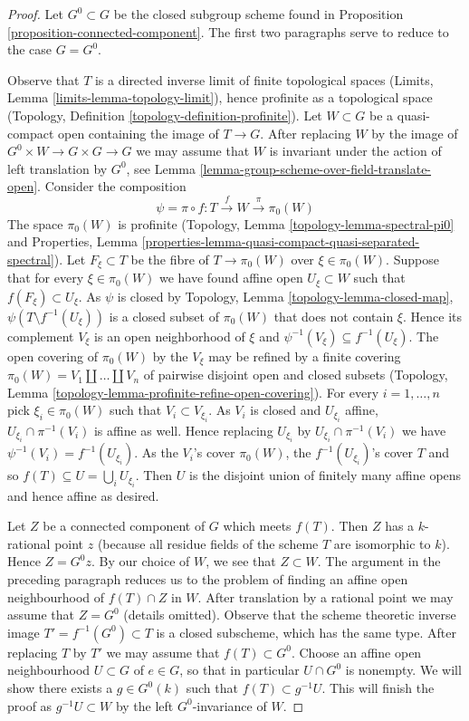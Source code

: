 \begin{proof}
Let $G^0 \subset G$ be the closed subgroup scheme found in
Proposition \ref{proposition-connected-component}. The first two paragraphs
serve to reduce to the case $G = G^0$.

\medskip\noindent
Observe that $T$ is a directed inverse limit of finite topological spaces
(Limits, Lemma \ref{limits-lemma-topology-limit}), hence profinite as a
topological space (Topology, Definition \ref{topology-definition-profinite}).
Let $W \subset G$ be a quasi-compact open containing the image of $T \to G$.
After replacing $W$ by the image of $G^0 \times W \to G \times G \to G$ we may
assume that $W$ is invariant under the action of left translation by $G^0$, see
Lemma \ref{lemma-group-scheme-over-field-translate-open}.
Consider the composition
$$
\psi = \pi \circ f : T \xrightarrow{f} W \xrightarrow{\pi} \pi_0(W)
$$
The space $\pi_0(W)$ is profinite
(Topology, Lemma \ref{topology-lemma-spectral-pi0} and
Properties, Lemma
\ref{properties-lemma-quasi-compact-quasi-separated-spectral}).
Let $F_\xi \subset T$ be the fibre of $T \to \pi_0(W)$ over $\xi \in \pi_0(W)$.
Suppose that for every $\xi \in \pi_0(W)$ we have found affine open
$U_\xi \subset W$ such that $f(F_\xi) \subset U_\xi$. As $\psi$ is closed by
Topology, Lemma \ref{topology-lemma-closed-map},
$\psi(T \setminus f^{-1}(U_\xi))$ is a closed subset of $\pi_0(W)$
that does not contain $\xi$. Hence its complement $V_\xi$ is an
open neighborhood of $\xi$ and $\psi^{-1}(V_\xi) \subseteq f^{-1}(U_\xi)$.
The open covering of $\pi_0(W)$ by the $V_\xi$ may be refined by
a finite covering $\pi_0(W) = V_1 \amalg \ldots \amalg V_n$
of pairwise disjoint open and closed subsets (Topology,
Lemma \ref{topology-lemma-profinite-refine-open-covering}).
For every $i = 1, \ldots, n$ pick $\xi_i \in \pi_0(W)$
such that $V_i \subset V_{\xi_i}$. As $V_i$ is closed and
$U_{\xi_i}$ affine, $U_{\xi_i} \cap \pi^{-1}(V_i)$ is affine as well.
Hence replacing $U_{\xi_i}$ by $U_{\xi_i} \cap \pi^{-1}(V_i)$ we
have $\psi^{-1}(V_i) = f^{-1}(U_{\xi_i})$. As the $V_i$'s cover
$\pi_0(W)$, the $f^{-1}(U_{\xi_i})$'s cover $T$ and so
$f(T) \subseteq U = \bigcup_i U_{\xi_i}$. Then $U$ is the disjoint
union of finitely many affine opens and hence affine as desired.

\medskip\noindent
Let $Z$ be a connected component of $G$ which meets $f(T)$. Then $Z$
has a $k$-rational point $z$ (because all residue fields of the scheme $T$
are isomorphic to $k$). Hence $Z = G^0 z$. By our choice of $W$, we see
that $Z \subset W$. The argument in the preceding paragraph reduces us to
the problem of finding an affine open neighbourhood of $f(T) \cap Z$ in $W$.
After translation by a rational point we may assume that $Z = G^0$
(details omitted). Observe that the scheme theoretic inverse image
$T' = f^{-1}(G^0) \subset T$ is a closed subscheme, which has the same type.
After replacing $T$ by $T'$ we may assume that $f(T) \subset G^0$.
Choose an affine open neighbourhood $U \subset G$
of $e \in G$, so that in particular $U \cap G^0$ is nonempty. We will show
there exists a $g \in G^0(k)$ such that $f(T) \subset g^{-1}U$.
This will finish the proof as $g^{-1}U \subset W$ by the left
$G^0$-invariance of $W$.


\end{proof}
